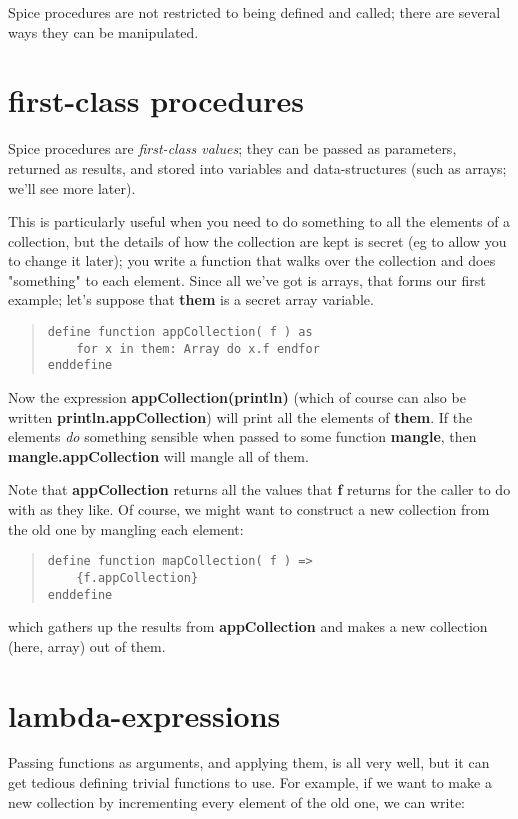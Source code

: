\documentclass{report}
\begin{document}
Spice procedures are not restricted to being defined and called; there are
several ways they can be manipulated.

\section{first-class procedures}


Spice procedures are {\em first-class values}; they can be passed as parameters,
returned as results, and stored into variables and data-structures (such as
arrays; we'll see more later).

This is particularly useful when you need to do something to all the elements
of a collection, but the details of how the collection are kept is secret
(eg to allow you to change it later); you write a function that walks over
the collection and does "something" to each element. Since all we've got
is arrays, that forms our first example; let's suppose that {\bf them} is
a secret array variable.

\begin{quote}
\begin{verbatim}
define function appCollection( f ) as
    for x in them: Array do x.f endfor
enddefine
\end{verbatim}
\end{quote}
Now the expression {\bf appCollection(println)} (which of course can also be
written {\bf println.appCollection}) will print all the elements of {\bf them}. If the
elements {\em do} something sensible when passed to some function {\bf mangle}, then
{\bf mangle.appCollection} will mangle all of them.

Note that {\bf appCollection} returns all the values that {\bf f} returns for the
caller to do with as they like. Of course, we might want to construct a new
collection from the old one by mangling each element:

\begin{quote}
\begin{verbatim}
define function mapCollection( f ) =>
    {f.appCollection}
enddefine
\end{verbatim}
\end{quote}
which gathers up the results from {\bf appCollection} and makes a new collection
(here, array) out of them.\section{lambda-expressions}


Passing functions as arguments, and applying them, is all very well, but it
can get tedious defining trivial functions to use. For example, if
we want to make a new collection by incrementing every element of the
old one, we can write:
\end{document}
